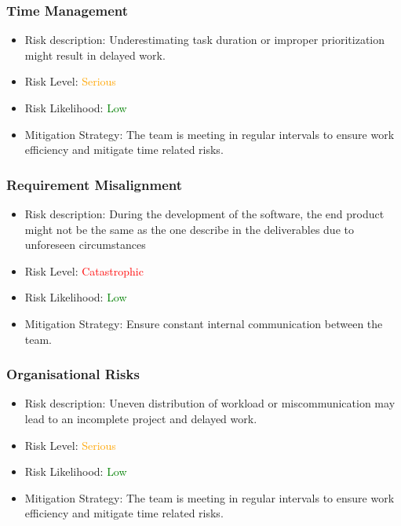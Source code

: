 \documentclass{article}
\begin{document}
\subsubsection{Time Management}
\begin{itemize}
    \item Risk description: Underestimating  task duration or improper prioritization might result in delayed work.
    \item Risk Level: \textcolor{orange}{Serious}
    \item Risk Likelihood: \textcolor{green}{Low}
    \item Mitigation Strategy: The team is meeting in regular intervals to ensure work efficiency and mitigate time related risks.
\end{itemize}

\subsubsection{Requirement Misalignment}
\begin{itemize}
    \item Risk description: During the development of the software, the end product might not be the same as the one describe in the deliverables due to unforeseen circumstances
    \item Risk Level: \textcolor{red}{Catastrophic}
    \item Risk Likelihood: \textcolor{green}{Low}
    \item Mitigation Strategy: Ensure constant internal communication between the team.
\end{itemize}

\subsubsection{Organisational Risks}
\begin{itemize}
    \item Risk description: Uneven distribution of workload or miscommunication may lead to an incomplete project and delayed work. 
    \item Risk Level: \textcolor{orange}{Serious}
    \item Risk Likelihood: \textcolor{green}{Low}
    \item Mitigation Strategy: The team is meeting in regular intervals to ensure work efficiency and mitigate time related risks.
\end{itemize}
\end{document}
